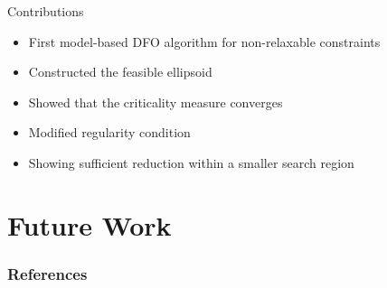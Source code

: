 \documentclass{beamer}
\begin{document}
\begin{frame}{Contributions}
	\begin{itemize}
		\item First model-based DFO algorithm for non-relaxable constraints
		\item Constructed the feasible ellipsoid
		\item Showed that the criticality measure converges
		\item Modified regularity condition
		\item Showing sufficient reduction within a smaller search region
	\end{itemize}
\end{frame}



\section{Future Work}





\begin{frame}[allowframebreaks]
	\frametitle{References}
	
	
\end{frame}
\end{document}
